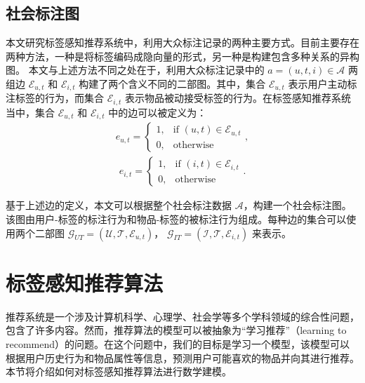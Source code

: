 \subsection{社会标注图}
本文研究标签感知推荐系统中，利用大众标注记录的两种主要方式。目前主要存在两种方法，一种是将标签编码成隐向量的形式\cite{zuo_tag-aware_2016,chen_airec_2021}，另一种是构建包含多种关系的异构图\cite{chen_tgcn_2020}。
本文与上述方法不同之处在于，利用大众标注记录中的 $a=(u,t,i) \in \mathcal{A}$ 两组边 $\mathcal{E}_{u,t}$ 和 $\mathcal{E}_{i,t}$ 构建了两个含义不同的二部图。其中，集合 $\mathcal{E}_{u,t}$ 表示用户主动标注标签的行为，而集合 $\mathcal{E}_{i,t}$ 表示物品被动接受标签的行为。在标签感知推荐系统当中，集合 $\mathcal{E}_{u,t}$ 和 $\mathcal{E}_{i,t}$ 中的边可以被定义为：
\begin{gather}
    e_{u,t} = 
    \begin{cases}
        1,&\text{if $(u,t) \in \mathcal{E}_{u,t}$} \\
        0,&\text{otherwise}
    \end{cases},
\end{gather}
\begin{gather}
    e_{i,t} = 
    \begin{cases}
        1,&\text{if $(i,t) \in \mathcal{E}_{i,t}$} \\
        0,&\text{otherwise}
    \end{cases}.
\end{gather}

基于上述边的定义，本文可以根据整个社会标注数据 $\mathcal{A}$，构建一个社会标注图。该图由用户-标签的标注行为和物品-标签的被标注行为组成。每种边的集合可以使用两个二部图 $\mathcal{G}_{UT} = (\mathcal{U}, \mathcal{T}, \mathcal{E}_{u,t})$， $\mathcal{G}_{IT} = (\mathcal{I}, \mathcal{T}, \mathcal{E}_{i,t})$ 来表示。

\section{标签感知推荐算法}
推荐系统是一个涉及计算机科学、心理学、社会学等多个学科领域的综合性问题，包含了许多内容。然而，推荐算法的模型可以被抽象为“学习推荐”（learning to recommend）的问题。在这个问题中，我们的目标是学习一个模型，该模型可以根据用户历史行为和物品属性等信息，预测用户可能喜欢的物品并向其进行推荐。本节将介绍如何对标签感知推荐算法进行数学建模。

